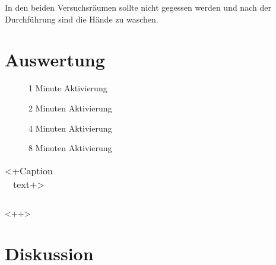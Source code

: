 \documentclass[12pt,a4paper,titlepage,headinclude,bibtotoc]{scrartcl}
\begin{document}
In den beiden Versuchsräumen sollte nicht gegessen werden und nach der Durchführung sind die Hände zu waschen.


\section{Auswertung}
\label{sec:auswertung}

\begin{figure}[h]
\centering

\caption{1 Minute Aktivierung}
\label{fig:1min}
\end{figure}

\begin{figure}[h]
\centering

\caption{2 Minuten Aktivierung}
\label{fig:2min}
\end{figure}

\begin{figure}[h]
\centering

\caption{4 Minuten Aktivierung}
\label{fig:4min}
\end{figure}

\begin{figure}[h]
\centering

\caption{8 Minuten Aktivierung}
\label{fig:8min}
\end{figure}

\begin{table}
\centering
\begin{tabular}{|c|c|c|}
\hline


\end{tabular}
\caption{<+Caption text+>}
\label{tab:<+label+>}
\end{table}<++>

\section{Diskussion}
\label{sec:diskussion}



\end{document}
